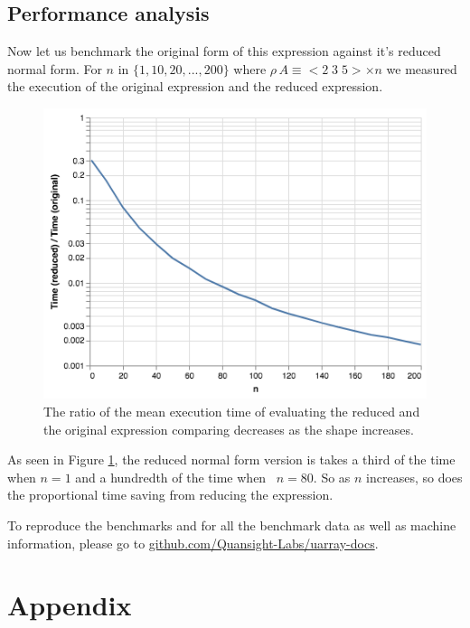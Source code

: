 \documentclass[a4paper,12pt]{article}
\newcommand{\shape}{\rho\,}                       %
\newcommand{\vccc}[3]{<#1\;#2\;#3>}               %
\begin{document}
\subsection{Performance analysis}

Now let us benchmark the original form of this expression against it's reduced normal form.
For $n$ in ${\{1, 10, 20, ..., 200\}}$ where $\shape A \equiv \vccc2 3 5 \times n$ we measured the
execution of the original expression and the reduced expression.

\begin{figure}[h]
  \includegraphics[width=1\textwidth]{benchmarks/visualization-ratio.png}
  \caption{The ratio of the mean execution time of evaluating the reduced and the original expression comparing decreases as the shape increases.}
  \label{fig:plot}
\end{figure}

As seen in Figure \ref{fig:plot}, the reduced normal form version is takes a third of the time when $n=1$ and a hundredth of the time when
~$n=80$. So as $n$ increases, so does the proportional time saving from reducing the expression.

To reproduce the benchmarks and for all the benchmark data as well as machine information, please go to \href{https://github.com/Quansight-Labs/uarray-docs/tree/fcb6baf8bb7284ac7223de73a70cf47063df9e4b/benchmarks}{github.com/Quansight-Labs/uarray-docs}.

\section*{Appendix}
\end{document}
